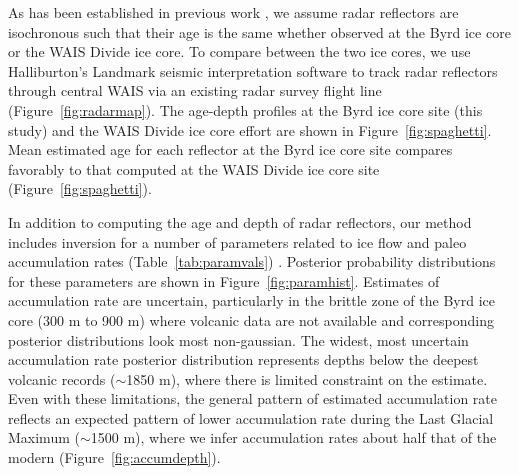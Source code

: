 As has been established in previous work \citep{siegert1998,dowdeswell2004}, we assume radar reflectors are isochronous such that their age is the same whether observed at the Byrd ice core or the WAIS Divide ice core. To compare between the two ice cores, we use Halliburton's Landmark seismic interpretation software to track radar reflectors through central WAIS via an existing radar survey flight line (Figure~\ref{fig:radarmap}). The age-depth profiles at the Byrd ice core site (this study) and the WAIS Divide ice core effort \citep{buizert2015} are shown in Figure~\ref{fig:spaghetti}. Mean estimated age for each reflector at the Byrd ice core site compares favorably to that computed at the WAIS Divide ice core site (Figure~\ref{fig:spaghetti}).  

In addition to computing the age and depth of radar reflectors, our method includes inversion for a number of parameters related to ice flow and paleo accumulation rates (Table~\ref{tab:paramvals}) . Posterior probability distributions for these parameters are shown in Figure~\ref{fig:paramhist}. Estimates of accumulation rate are uncertain, particularly in the brittle zone of the Byrd ice core (300 m to 900 m) where volcanic data are not available and corresponding posterior distributions look most non-gaussian. The widest, most uncertain accumulation rate posterior distribution represents depths below the deepest volcanic records ($\sim$1850 m), where there is limited constraint on the estimate. Even with these limitations, the general pattern of estimated accumulation rate reflects an expected pattern of lower accumulation rate during the Last Glacial Maximum ($\sim$1500 m), where we infer accumulation rates about half that of the modern (Figure~\ref{fig:accumdepth}). 

